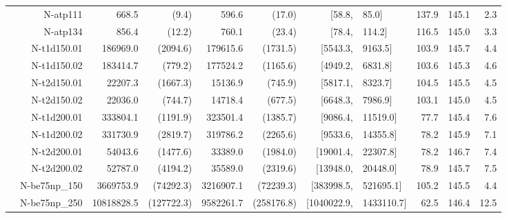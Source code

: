 \documentclass[runningheads]{llncs}
\begin{document}
\begin{table}[tb]
{\begin{tabular}{r@{\hskip -2ex}*{5}{r}rl@{\hskip -2ex}*{3}{r}}
& N-atp111       & 668.5               & (9.4)              & 596.6              & (17.0)            & [58.8,               & 85.0]               & 137.9        & 145.1 & 2.3  \\
& N-atp134       & 856.4               & (12.2)             & 760.1              & (23.4)            & [78.4,               & 114.2]              & 116.5        & 145.0 & 3.3  \\
& N-t1d150.01    & 186969.0            & (2094.6)           & 179615.6           & (1731.5)          & [5543.3,             & 9163.5]             & 103.9        & 145.7 & 4.4  \\
& N-t1d150.02    & 183414.7            & (779.2)            & 177524.2           & (1165.6)          & [4949.2,             & 6831.8]             & 103.6        & 145.3 & 4.6  \\
& N-t2d150.01    & 22207.3             & (1667.3)           & 15136.9            & (745.9)           & [5817.1,             & 8323.7]             & 104.5        & 145.5 & 4.5  \\
& N-t2d150.02    & 22036.0             & (744.7)            & 14718.4            & (677.5)           & [6648.3,             & 7986.9]             & 103.1        & 145.0 & 4.5  \\
& N-t1d200.01    & 333804.1            & (1191.9)           & 323501.4           & (1385.7)          & [9086.4,             & 11519.0]            & 77.7         & 145.4 & 7.6  \\
& N-t1d200.02    & 331730.9            & (2819.7)           & 319786.2           & (2265.6)          & [9533.6,             & 14355.8]            & 78.2         & 145.9 & 7.1  \\
& N-t2d200.01    & 54043.6             & (1477.6)           & 33389.0            & (1984.0)          & [19001.4,            & 22307.8]            & 78.2         & 146.7 & 7.4  \\
& N-t2d200.02    & 52787.0             & (4194.2)           & 35589.0            & (2319.6)          & [13948.0,            & 20448.0]            & 78.9         & 145.7 & 7.5  \\
& N-be75np\_150  & 3669753.9           & (74292.3)          & 3216907.1          & (72239.3)         & [383998.5,           & 521695.1]           & 105.2        & 145.5 & 4.4  \\
& N-be75np\_250  & 10818828.5          & (127722.3)         & 9582261.7          & (258176.8)        & [1040022.9,          & 1433110.7]          & 62.5         & 146.4 & 12.5 \\

\end{tabular}}
\end{table}
\end{document}

